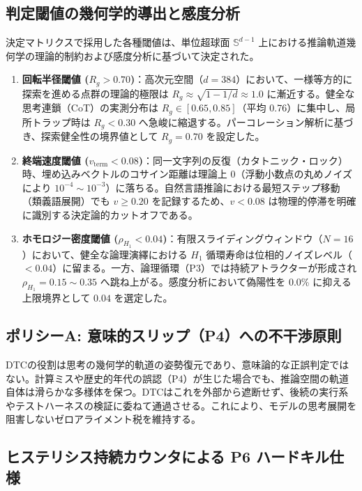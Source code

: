 \documentclass[11pt,a4paper]{article}
\begin{document}
\subsection{判定閾値の幾何学的導出と感度分析}

決定マトリクスで採用した各種閾値は、単位超球面 $\mathbb{S}^{d-1}$ 上における推論軌道幾何学の理論的制約および感度分析に基づいて決定された。
\begin{enumerate}
    \item \textbf{回転半径閾値 ($R_g > 0.70$)}：高次元空間（$d=384$）において、一様等方的に探索を進める点群の理論的極限は $R_g \approx \sqrt{1 - 1/d} \approx 1.0$ に漸近する。健全な思考連鎖（CoT）の実測分布は $R_g \in [0.65, 0.85]$（平均 0.76）に集中し、局所トラップ時は $R_g < 0.30$ へ急峻に縮退する。パーコレーション解析に基づき、探索健全性の境界値として $R_g = 0.70$ を設定した。
    \item \textbf{終端速度閾値 ($v_{\mathrm{term}} < 0.08$)}：同一文字列の反復（カタトニック・ロック）時、埋め込みベクトルのコサイン距離は理論上 $0$（浮動小数点の丸めノイズにより $10^{-4} \sim 10^{-3}$）に落ちる。自然言語推論における最短ステップ移動（類義語展開）でも $v \ge 0.20$ を記録するため、$v < 0.08$ は物理的停滞を明確に識別する決定論的カットオフである。
    \item \textbf{ホモロジー密度閾値 ($\rho_{H_1} < 0.04$)}：有限スライディングウィンドウ（$N=16$）において、健全な論理演繹における $H_1$ 循環寿命は位相的ノイズレベル（$< 0.04$）に留まる。一方、論理循環（P3）では持続アトラクターが形成され $\rho_{H_1} = 0.15 \sim 0.35$ へ跳ね上がる。感度分析において偽陽性を 0.0\% に抑える上限境界として $0.04$ を選定した。
\end{enumerate}

\subsection{ポリシーA: 意味的スリップ（P4）への不干渉原則}

DTCの役割は思考の幾何学的軌道の姿勢復元であり、意味論的な正誤判定ではない。計算ミスや歴史的年代の誤認（P4）が生じた場合でも、推論空間の軌道自体は滑らかな多様体を保つ。DTCはこれを外部から遮断せず、後続の実行系やテストハーネスの検証に委ねて通過させる。これにより、モデルの思考展開を阻害しないゼロアライメント税を維持する。

\subsection{ヒステリシス持続カウンタによる P6 ハードキル仕様}
\end{document}
